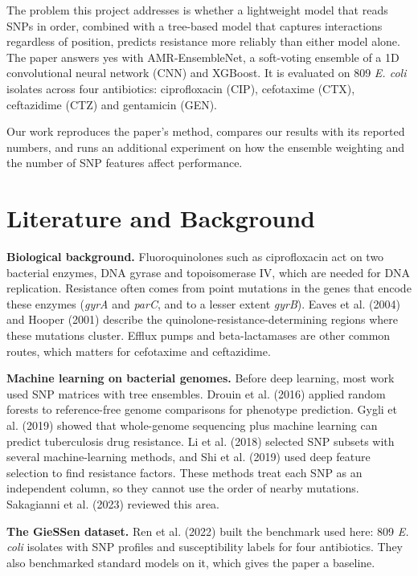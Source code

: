 \documentclass[11pt]{article}
\begin{document}
The problem this project addresses is whether a lightweight model that reads SNPs in order, combined with a tree-based model that captures interactions regardless of position, predicts resistance more reliably than either model alone. The paper answers yes with AMR-EnsembleNet, a soft-voting ensemble of a 1D convolutional neural network (CNN) and XGBoost. It is evaluated on 809 \textit{E. coli} isolates across four antibiotics: ciprofloxacin (CIP), cefotaxime (CTX), ceftazidime (CTZ) and gentamicin (GEN).

Our work reproduces the paper's method, compares our results with its reported numbers, and runs an additional experiment on how the ensemble weighting and the number of SNP features affect performance.

\section{Literature and Background}

\textbf{Biological background.} Fluoroquinolones such as ciprofloxacin act on two bacterial enzymes, DNA gyrase and topoisomerase IV, which are needed for DNA replication. Resistance often comes from point mutations in the genes that encode these enzymes (\textit{gyrA} and \textit{parC}, and to a lesser extent \textit{gyrB}). Eaves et al. (2004) and Hooper (2001) describe the quinolone-resistance-determining regions where these mutations cluster. Efflux pumps and beta-lactamases are other common routes, which matters for cefotaxime and ceftazidime.

\textbf{Machine learning on bacterial genomes.} Before deep learning, most work used SNP matrices with tree ensembles. Drouin et al. (2016) applied random forests to reference-free genome comparisons for phenotype prediction. Gygli et al. (2019) showed that whole-genome sequencing plus machine learning can predict tuberculosis drug resistance. Li et al. (2018) selected SNP subsets with several machine-learning methods, and Shi et al. (2019) used deep feature selection to find resistance factors. These methods treat each SNP as an independent column, so they cannot use the order of nearby mutations. Sakagianni et al. (2023) reviewed this area.

\textbf{The GieSSen dataset.} Ren et al. (2022) built the benchmark used here: 809 \textit{E. coli} isolates with SNP profiles and susceptibility labels for four antibiotics. They also benchmarked standard models on it, which gives the paper a baseline.
\end{document}
